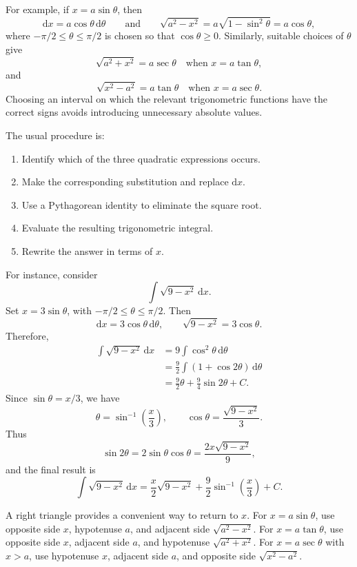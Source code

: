 For example, if \(x=a\sin\theta\), then
\[
    \mathrm{d}x=a\cos\theta\,\mathrm{d}\theta
    \qquad\text{and}\qquad
    \sqrt{a^2-x^2}
    =a\sqrt{1-\sin^2\theta}
    =a\cos\theta,
\]
where \(-\pi/2\leq\theta\leq\pi/2\) is chosen so that
\(\cos\theta\geq0\).  Similarly, suitable choices of \(\theta\) give
\[
    \sqrt{a^2+x^2}=a\sec\theta
    \quad\text{when }x=a\tan\theta,
\]
and
\[
    \sqrt{x^2-a^2}=a\tan\theta
    \quad\text{when }x=a\sec\theta.
\]
Choosing an interval on which the relevant trigonometric functions have the
correct signs avoids introducing unnecessary absolute values.

The usual procedure is:
\begin{enumerate}
    \item Identify which of the three quadratic expressions occurs.
    \item Make the corresponding substitution and replace
    \(\mathrm{d}x\).
    \item Use a Pythagorean identity to eliminate the square root.
    \item Evaluate the resulting trigonometric integral.
    \item Rewrite the answer in terms of \(x\).
\end{enumerate}

For instance, consider
\[
    \int\sqrt{9-x^2}\,\mathrm{d}x.
\]
Set \(x=3\sin\theta\), with
\(-\pi/2\leq\theta\leq\pi/2\).  Then
\[
    \mathrm{d}x=3\cos\theta\,\mathrm{d}\theta,
    \qquad
    \sqrt{9-x^2}=3\cos\theta.
\]
Therefore,
\begin{align*}
    \int\sqrt{9-x^2}\,\mathrm{d}x
    &=9\int\cos^2\theta\,\mathrm{d}\theta \\
    &=\frac92\int(1+\cos2\theta)\,\mathrm{d}\theta \\
    &=\frac92\theta+\frac94\sin2\theta+C.
\end{align*}
Since \(\sin\theta=x/3\), we have
\[
    \theta=\sin^{-1}\!\left(\frac{x}{3}\right),
    \qquad
    \cos\theta=\frac{\sqrt{9-x^2}}{3}.
\]
Thus
\[
    \sin2\theta
    =2\sin\theta\cos\theta
    =\frac{2x\sqrt{9-x^2}}{9},
\]
and the final result is
\[
    \boxed{
        \int\sqrt{9-x^2}\,\mathrm{d}x
        =\frac{x}{2}\sqrt{9-x^2}
         +\frac92\sin^{-1}\!\left(\frac{x}{3}\right)+C
    }.
\]

A right triangle provides a convenient way to return to \(x\).  For
\(x=a\sin\theta\), use opposite side \(x\), hypotenuse \(a\), and adjacent
side \(\sqrt{a^2-x^2}\).  For \(x=a\tan\theta\), use opposite side \(x\),
adjacent side \(a\), and hypotenuse \(\sqrt{a^2+x^2}\).  For
\(x=a\sec\theta\) with \(x>a\), use hypotenuse \(x\), adjacent side \(a\),
and opposite side \(\sqrt{x^2-a^2}\).

